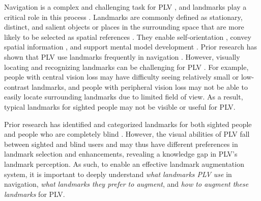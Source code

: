 Navigation is a complex and challenging task for PLV \cite{corn2010foundations,szpiro2016finding}, and landmarks play a critical role in this process \cite{siegel1975development}. Landmarks are commonly defined as stationary, distinct, and salient objects or places in the surrounding space that are more likely to be selected as spatial references \cite{yesiltepe2021landmarks, millonig2007developing}. They enable self-orientation \cite{raubal2002enriching}, convey spatial information \cite{tom2003referring,lovelace1999elements}, and support mental model development \cite{michon2001and, millonig2007developing}. Prior research has shown that PLV use landmarks frequently in navigation \cite{szpiro2016finding}. However, visually locating and recognizing landmarks can be challenging for PLV \cite{huang2019augmented, szpiro2016finding}. For example, people with central vision loss may have difficulty seeing relatively small or low-contrast landmarks, and people with peripheral vision loss may not be able to easily locate surrounding landmarks due to limited field of view. As a result, typical landmarks for sighted people may not be visible or useful for PLV. %

Prior research has identified and categorized landmarks for both sighted people \cite{lynch1964image,yesiltepe2021landmarks,sorrows1999nature} and people who are completely blind \cite{tsuji12005landmarks,jeamwatthanachai2019indoor,wang2023understanding}. However, the visual abilities of PLV fall between sighted and blind users and may thus have different preferences in landmark selection and enhancements, revealing a knowledge gap in PLV's landmark perception. %
As such, to enable an effective landmark augmentation system, it is important to deeply understand \textit{what landmarks PLV use} in navigation, \textit{what landmarks they prefer to augment}, and \textit{how to augment these landmarks} for PLV.%


